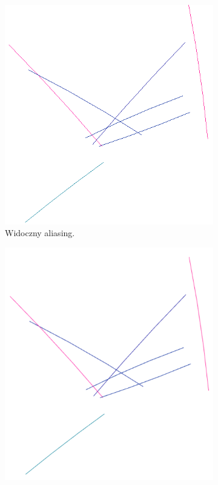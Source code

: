 \begin{figure}[H]
	\begin{subfigure}{0.45\textwidth}
		\centering
 		\includegraphics[width=\textwidth]{withAliasing.png}
    	\caption{Widoczny aliasing.}
 		\label{rys25}
	\end{subfigure}
	\hfill
	\begin{subfigure}{0.45\textwidth}
		\centering
		\includegraphics[width=\textwidth]{Antialiasing.png}

\end{subfigure}
\end{figure}
